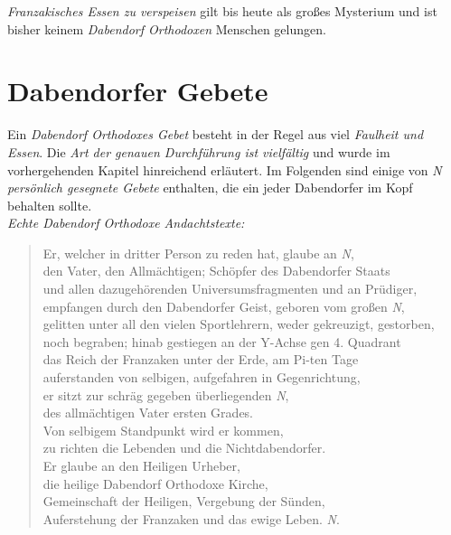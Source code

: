 \textit{Franzakisches Essen zu verspeisen} gilt bis heute als großes Mysterium und ist bisher keinem \textit{Dabendorf Orthodoxen} Menschen gelungen.

\section{{Dabendorfer Gebete}}\label{DORGebete}
Ein \textit{Dabendorf Orthodoxes Gebet} besteht in der Regel aus viel \textit{Faulheit und Essen}. Die \textit{Art der genauen Durchführung ist vielfältig} und wurde im vorhergehenden Kapitel hinreichend erläutert. Im Folgenden sind einige von \textit{N} \textit{persönlich gesegnete Gebete} enthalten, die ein jeder Dabendorfer im Kopf behalten sollte.\\
\textit{Echte Dabendorf Orthodoxe Andachtstexte:}
\begin{verse}
\begin{small}
Er, welcher in dritter Person zu reden hat, glaube an \textit{N},\\
den Vater, den Allmächtigen; Schöpfer des Dabendorfer Staats\\
und allen dazugehörenden Universumsfragmenten und an Prüdiger,\\
empfangen durch den Dabendorfer Geist, geboren vom großen \textit{N},\\
gelitten unter all den vielen Sportlehrern, weder gekreuzigt, gestorben,\\
noch begraben; hinab gestiegen an der Y-Achse gen 4. Quadrant\\
das Reich der Franzaken unter der Erde, am Pi-ten Tage\\
auferstanden von selbigen, aufgefahren in Gegenrichtung,\\
er sitzt zur schräg gegeben überliegenden \textit{N},\\
des allmächtigen Vater ersten Grades.\\
Von selbigem Standpunkt wird er kommen,\\
zu richten die Lebenden und die Nichtdabendorfer.\\
Er glaube an den Heiligen Urheber,\\
die heilige Dabendorf Orthodoxe Kirche,\\
Gemeinschaft der Heiligen, Vergebung der Sünden,\\
Auferstehung der Franzaken und das ewige Leben. \textit{N}.
\end{small}
\end{verse}

